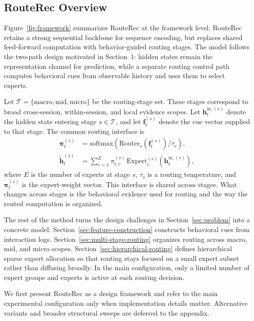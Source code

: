 \documentclass[sigconf,review,anonymous]{acmart}
\begin{document}
\subsection{RouteRec Overview}
\label{sec:routerec-overview}

Figure~\ref{fig:framework} summarizes RouteRec at the framework level. RouteRec retains a strong sequential backbone for sequence encoding, but replaces shared feed-forward computation with behavior-guided routing stages. The model follows the two-path design motivated in Section~1: hidden states remain the representation channel for prediction, while a separate routing control path computes behavioral cues from observable history and uses them to select experts.

Let $\mathcal{T}=\{\mathrm{macro},\mathrm{mid},\mathrm{micro}\}$ be the routing-stage set. These stages correspond to broad cross-session, within-session, and local evidence scopes. Let $\mathbf{h}^{\mathrm{in},(s)}_t$ denote the hidden state entering stage $s\in\mathcal{T}$, and let $\mathbf{f}^{(s)}_t$ denote the cue vector supplied to that stage. The common routing interface is
\begin{align}
\boldsymbol{\pi}^{(s)}_t
&=
\mathrm{softmax}\!\left(\mathrm{Router}_s(\mathbf{f}^{(s)}_t)/\tau_s\right), \\
\tilde{\mathbf{h}}^{(s)}_t
&=
\sum_{e=1}^{E}\pi^{(s)}_{t,e}\,\mathrm{Expert}^{(s)}_e(\mathbf{h}^{\mathrm{in},(s)}_t),
\label{eq:stage-routing}
\end{align}
where $E$ is the number of experts at stage $s$, $\tau_s$ is a routing temperature, and $\boldsymbol{\pi}^{(s)}_t$ is the expert-weight vector. This interface is shared across stages. What changes across stages is the behavioral evidence used for routing and the way the routed computation is organized.

The rest of the method turns the design challenges in Section~\ref{sec:problem} into a concrete model. Section~\ref{sec:feature-construction} constructs behavioral cues from interaction logs. Section~\ref{sec:multi-stage-routing} organizes routing across macro, mid, and micro scopes. Section~\ref{sec:hierarchical-routing} defines hierarchical sparse expert allocation so that routing stays focused on a small expert subset rather than diffusing broadly. In the main configuration, only a limited number of expert groups and experts is active at each routing decision.

We first present RouteRec as a design framework and refer to the main experimental configuration only when implementation details matter. Alternative variants and broader structural sweeps are deferred to the appendix.
\end{document}
